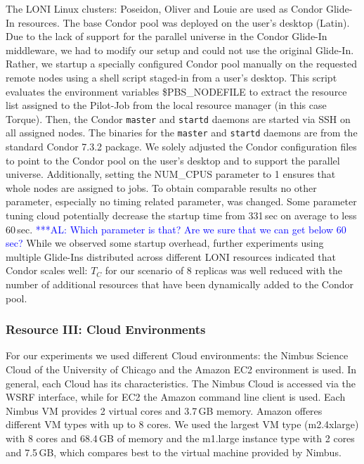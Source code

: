 \documentclass[conference,final]{IEEEtran}
\newcommand{\tc}{$T_{C}$ }
\newcommand{\alnote}[1]{ {\textcolor{blue} { ***AL: #1 }}}
\newcommand{\alnote}[1]{}
\begin{document}
The LONI Linux clusters: Poseidon, Oliver and Louie are used as Condor Glide-In 
resources. The base Condor pool was deployed on the user's desktop
(Latin). Due to the lack of support for the parallel universe in the
Condor Glide-In middleware, we had to modify our setup and could not
use the original Glide-In. Rather, we startup a specially configured 
Condor pool manually on the requested remote nodes using 
a shell script staged-in from a user's desktop. This script evaluates 
the environment variables \$PBS\_NODEFILE to extract the resource list assigned to
the Pilot-Job from the local resource manager (in this case Torque). Then, the 
Condor \texttt{master} and \texttt{startd} daemons are started 
via SSH on all assigned nodes. The binaries for the \texttt{master} and 
\texttt{startd} daemons are from the standard Condor 7.3.2 package. 
We solely adjusted the Condor configuration files to point to the Condor
pool on the user's desktop and to support the parallel universe.
Additionally, setting the NUM\_CPUS parameter to 1 ensures that 
whole nodes are assigned to jobs.
To obtain comparable results no other parameter, especially no timing related parameter, 
was changed. Some parameter tuning cloud potentially decrease the
startup time from 331\,sec on average to less 60\,sec. \alnote{Which parameter is that? Are
we sure that we can get below 60 sec?} While we observed
some startup overhead, further experiments using multiple Glide-Ins distributed
across different LONI resources indicated that Condor scales well: \tc for our
scenario of 8 replicas was well reduced with the number of additional resources that have
been dynamically added to the Condor pool. 


\subsubsection*{Resource III: Cloud Environments}

For our experiments we used different Cloud environments: 
the Nimbus Science Cloud of the University of Chicago and the 
Amazon EC2 environment is used. In general, each Cloud has 
its characteristics. The Nimbus Cloud is accessed via the WSRF
interface, while for EC2 the Amazon command line 
client is used. Each Nimbus VM provides 2 virtual cores and 3.7\,GB memory. 
Amazon offeres different VM types with up to 8 cores. We used 
the largest VM type (m2.4xlarge) with 8 cores and 68.4\,GB of memory
and the m1.large instance type with 2 cores and 7.5\,GB, which compares
best to the virtual machine provided by Nimbus. 
\end{document}
